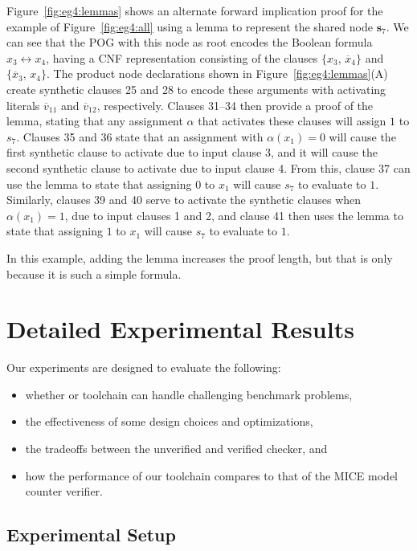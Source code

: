 \documentclass[letterpaper,USenglish,cleveref, autoref, thm-restate]{lipics-v2021}
\newcommand{\obar}[1]{\overline{#1}}
\newcommand{\assign}{\alpha}
\newcommand{\makenode}[1]{\mathbf{#1}}
\newcommand{\nodes}{\makenode{s}}
\begin{document}
Figure~\ref{fig:eg4:lemmas} shows an alternate forward implication
proof for the example of Figure~\ref{fig:eg4:all} using a lemma to
represent the shared node $\nodes_7$.  We can see that the POG with
this node as root encodes the Boolean formula $x_3 \leftrightarrow x_4$, having a CNF representation consisting of the clauses
$\{x_3 ,\, \obar{x}_4\}$ and $\{\obar{x}_3 ,\, {x}_4\}$.  The product node
declarations shown in Figure~\ref{fig:eg4:lemmas}(A) create synthetic
clauses 25 and 28 to encode these arguments with activating literals
$\obar{v}_{11}$ and $\obar{v}_{12}$, respectively.  Clauses 31--34
then provide a proof of the lemma, stating that any assignment
$\assign$ that activates these clauses will  assign $1$ to $s_7$.
Clauses 35 and 36 state that an assignment with $\assign(x_1) = 0$
will cause the first synthetic clause to activate due to input clause
3, and it will cause the second synthetic clause to activate due to
input clause 4.  From this, clause 37 can use the lemma to state that
assigning $0$ to $x_1$ will cause $s_7$ to evaluate to $1$.  Similarly,
clauses 39 and 40 serve to activate the synthetic clauses when
$\assign(x_1) = 1$, due to input clauses 1 and 2, and clause 41 then
uses the lemma to state that assigning $1$ to $x_1$ will cause $s_7$ to
evaluate to $1$.

In this example, adding the lemma increases the proof length, but that
is only because it is such a simple formula.




\section{Detailed Experimental Results}
\label{app:experiments}

Our experiments are designed to evaluate the following:
\begin{itemize}
\item
  whether or toolchain can handle challenging benchmark problems,
\item  
the effectiveness of some design choices and optimizations,
\item
the tradeoffs between the unverified and verified checker, and
\item
how the performance of our toolchain compares to that of the MICE model counter verifier.
\end{itemize}

\subsection{Experimental Setup}
\end{document}
